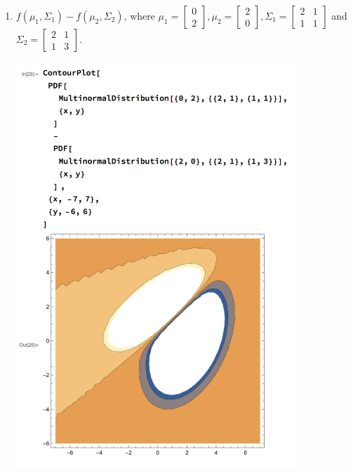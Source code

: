 \begin{enumerate}[label=(\alph*)]
    \newpage
    \item $f(\mu_1, \Sigma_1) - f(\mu_2, \Sigma_2)$, where $\mu_1 = \begin{bmatrix} 0 \\ 2 \end{bmatrix}, \mu_2 = \begin{bmatrix} 2 \\ 0 \end{bmatrix}, \Sigma_1 = \begin{bmatrix} 2 & 1 \\ 1 & 1 \end{bmatrix}$ and $\Sigma_2 = \begin{bmatrix} 2 & 1 \\ 1 & 3 \end{bmatrix}$.
    \begin{mdframed}
      \includegraphics[width=300pt]{img/hw03_2d.png}
    \end{mdframed}


\end{enumerate}
